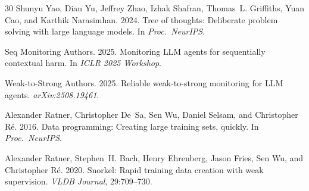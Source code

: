 \documentclass[11pt,a4paper]{article}
\begin{document}
\begin{thebibliography}{30}
Shunyu Yao, Dian Yu, Jeffrey Zhao, Izhak Shafran, Thomas~L. Griffiths, Yuan Cao, and Karthik Narasimhan. 2024.
\newblock Tree of thoughts: Deliberate problem solving with large language models.
\newblock In \emph{Proc.\ NeurIPS}.

{Seq Monitoring Authors}. 2025.
\newblock Monitoring {LLM} agents for sequentially contextual harm.
\newblock In \emph{ICLR 2025 Workshop}.

{Weak-to-Strong Authors}. 2025.
\newblock Reliable weak-to-strong monitoring for {LLM} agents.
\newblock \emph{arXiv:2508.19461}.

Alexander Ratner, Christopher De~Sa, Sen Wu, Daniel Selsam, and Christopher R\'{e}. 2016.
\newblock Data programming: Creating large training sets, quickly.
\newblock In \emph{Proc.\ NeurIPS}.

Alexander Ratner, Stephen~H. Bach, Henry Ehrenberg, Jason Fries, Sen Wu, and Christopher R\'{e}. 2020.
\newblock Snorkel: Rapid training data creation with weak supervision.
\newblock \emph{VLDB Journal}, 29:709--730.

\end{thebibliography}
\end{document}
